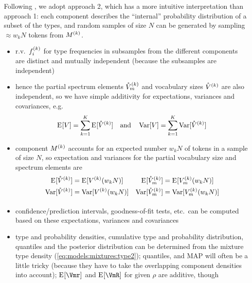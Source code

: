\documentclass[a4paper]{article}
\begin{document}
Following \citet[Sec.~4]{Baayen:01}, we adopt approach 2, which has a more
intuitive interpretation than approach 1: each component describes the
``internal'' probability distribution of a subset of the types, and random
samples of size $N$ can be generated by sampling $\approx w_k N$ tokens
from $M^{(k)}$.


\begin{itemize}
\item r.v.\ $f_i^{(k)}$ for type frequencies in subsamples from the different
  components are distinct and mutually independent (because the subsamples are
  independent)
\item hence the partial spectrum elements $\mathring{V}_m^{(k)}$ and vocabulary sizes
  $\mathring{V}^{(k)}$ are also independent, so we have simple additivity for
  expectations, variances and covariances, e.g.\
  \begin{equation}
    \label{eq:models:mixtures:partial-additive}
    \mathrm{E}_{}[V] = \sum_{k=1}^K \mathrm{E}_{}[\mathring{V}^{(k)}] \quad\text{and}\quad
    \mathop{\mathrm{Var}}_{}[V] = \sum_{k=1}^K \mathop{\mathrm{Var}}_{}[\mathring{V}^{(k)}]
  \end{equation}
\item component $M^{(k)}$ accounts for an expected number $w_k N$ of tokens
  in a sample of size $N$, so expectation and variances for the partial
  vocabulary size and spectrum elements are
  \begin{align}
    \label{eq:models:mixtures:partial-V-Vm}
    \mathrm{E}_{}[\mathring{V}^{(k)}] & = \mathrm{E}_{}[V^{(k)}(w_k N)] &
    \mathrm{E}_{}[\mathring{V}_m^{(k)}] & = \mathrm{E}_{}[V_m^{(k)}(w_k N)] \\
    \mathop{\mathrm{Var}}_{}[\mathring{V}^{(k)}] & = \mathop{\mathrm{Var}}_{}[V^{(k)}(w_k N)] &
    \mathop{\mathrm{Var}}_{}[\mathring{V}_m^{(k)}] & = \mathop{\mathrm{Var}}_{}[V_m^{(k)}(w_k N)] 
  \end{align}
\item confidence/prediction intervals, goodness-of-fit tests, etc.\ can be
  computed based on these expectations, variances and covariances
\item type and probability densities, cumulative type and probability
  distribution, quantiles and the posterior distribution can be determined
  from the mixture type density (\ref{eq:models:mixtures:type2}); quantiles,
  and MAP will often be a little tricky (because they have to take the
  overlapping component densities into account); $\Exp{\Vmr}$ and $\Exp{\VmR}$
  for given $\rho$ are additive, though

\end{itemize}
\end{document}
